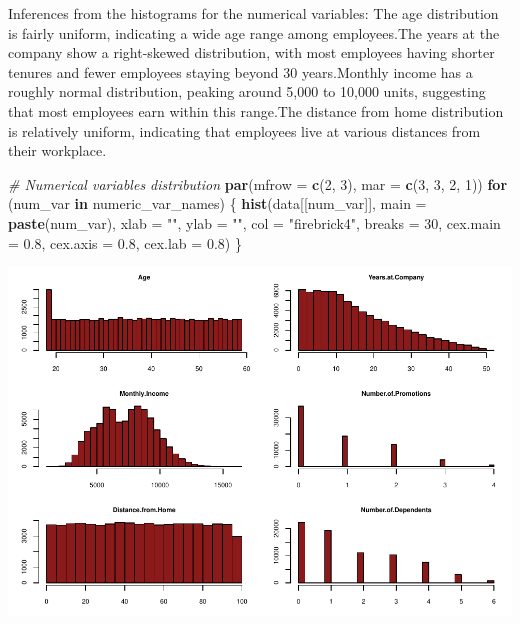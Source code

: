 \documentclass[
  10pt,
  paper=a4,
  ,captions=tableheading
]{scrartcl}
\newenvironment{Shaded}{\begin{snugshade}}{\end{snugshade}}
\newcommand{\AttributeTok}[1]{\textcolor[rgb]{0.13,0.29,0.53}{#1}}
\newcommand{\CommentTok}[1]{\textcolor[rgb]{0.56,0.35,0.01}{\textit{#1}}}
\newcommand{\ControlFlowTok}[1]{\textcolor[rgb]{0.13,0.29,0.53}{\textbf{#1}}}
\newcommand{\DecValTok}[1]{\textcolor[rgb]{0.00,0.00,0.81}{#1}}
\newcommand{\FloatTok}[1]{\textcolor[rgb]{0.00,0.00,0.81}{#1}}
\newcommand{\FunctionTok}[1]{\textcolor[rgb]{0.13,0.29,0.53}{\textbf{#1}}}
\newcommand{\NormalTok}[1]{#1}
\newcommand{\StringTok}[1]{\textcolor[rgb]{0.31,0.60,0.02}{#1}}
\begin{document}
Inferences from the histograms for the numerical variables: The age
distribution is fairly uniform, indicating a wide age range among
employees.The years at the company show a right-skewed distribution,
with most employees having shorter tenures and fewer employees staying
beyond 30 years.Monthly income has a roughly normal distribution,
peaking around 5,000 to 10,000 units, suggesting that most employees
earn within this range.The distance from home distribution is relatively
uniform, indicating that employees live at various distances from their
workplace.

\small

\begin{Shaded}
\begin{Highlighting}[]
\CommentTok{\# Numerical variables distribution}
\FunctionTok{par}\NormalTok{(}\AttributeTok{mfrow =} \FunctionTok{c}\NormalTok{(}\DecValTok{2}\NormalTok{, }\DecValTok{3}\NormalTok{), }\AttributeTok{mar =} \FunctionTok{c}\NormalTok{(}\DecValTok{3}\NormalTok{, }\DecValTok{3}\NormalTok{, }\DecValTok{2}\NormalTok{, }\DecValTok{1}\NormalTok{))}
\ControlFlowTok{for}\NormalTok{ (num\_var }\ControlFlowTok{in}\NormalTok{ numeric\_var\_names) \{}
    \FunctionTok{hist}\NormalTok{(data[[num\_var]], }\AttributeTok{main =} \FunctionTok{paste}\NormalTok{(num\_var), }\AttributeTok{xlab =} \StringTok{""}\NormalTok{, }\AttributeTok{ylab =} \StringTok{""}\NormalTok{, }\AttributeTok{col =} \StringTok{"firebrick4"}\NormalTok{,}
        \AttributeTok{breaks =} \DecValTok{30}\NormalTok{, }\AttributeTok{cex.main =} \FloatTok{0.8}\NormalTok{, }\AttributeTok{cex.axis =} \FloatTok{0.8}\NormalTok{, }\AttributeTok{cex.lab =} \FloatTok{0.8}\NormalTok{)}
\NormalTok{\}}
\end{Highlighting}
\end{Shaded}

\includegraphics[width=0.65\linewidth]{figs/data_numdist-1}

\small
\end{document}
